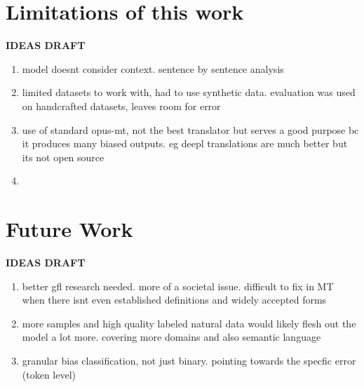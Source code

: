 \section{Limitations of this work}
\textbf{IDEAS DRAFT}
\begin{enumerate}
   \item model doesnt consider context. sentence by sentence analysis
   \item limited datasets to work with, had to use synthetic data. evaluation was used on handcrafted datasets, leaves room for error 
   \item use of standard opus-mt, not the best translator but serves a good purpose bc it produces many biased outputs. eg deepl translations are much better but its not open source
   \item 
\end{enumerate}

\section{Future Work}
\textbf{IDEAS DRAFT}
\begin{enumerate}
   \item better gfl research needed. more of a societal issue. difficult to fix in MT when there isnt even established definitions and widely accepted forms
   \item more samples and high quality labeled natural data would likely flesh out the model a lot more. covering more domains and also semantic language
   \item granular bias classification, not just binary. pointing towards the specfic error (token level)
\end{enumerate}

